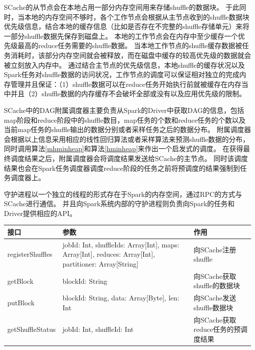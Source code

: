 SCache的从节点会在本地占用一部分内存空间用来存储shuffle的数据块。
于此同时，当本地的内存空间不够时，各个工作节点会根据从主节点收到的shuffle数据块优先级信息，结合本地的缓存信息（比如是否存在不完整的shuffle存储单元）来将一部分shuffle数据先保存到磁盘上。
本地的工作节点会在内存中至少缓存一个优先级最高的reduce任务需要的shuffle数据。
当本地工作节点的shuffle缓存数据被任务消耗时，该部分内存空间就会被释放，而在磁盘中缓存的较高优先级的数据就会被立刻放入内存中。
通过结合主节点的优先级信息，本地shuffle的缓存状况以及Spark任务对shuffle数据的访问状况，工作节点的调度可以保证相对独立的完成内存管理并且保证：（1）shuffle数据可以在reduce任务开始执行前就被缓存在内存当中并且（2）shuffle数据的内存缓存不会破坏全部或没有以及应用优先级的限制。

SCache中的DAG附属调度器主要负责从Spark的Driver中获取DAG的信息，包括map阶段和reduce阶段中的shuffle数目，map任务的个数和reduce任务的个数以及当前map任务的shuffle输出的数据分别或者采样任务之后的数据分布。
附属调度器会根据以上信息采用相应的线性回归算法或者采样算法来预测shuffle数据的分布，同时调用算法\ref{mhminheap}和算法\ref{hminheap}来作出一个启发式的调度。
在获得最终调度结果之后，附属调度器会将调度结果发送给SCache的主节点。
同时该调度结果也会在Spark任务调度器调度reduce阶段的任务之前将预调度的结果强制到任务调度器上。

守护进程以一个独立的线程的形式存在于Spark的内存空间，通过RPC的方式与SCache进行通信。
并且向Spark系统内部的守护进程则负责向Spark的任务和Driver提供相应的API。

\begin{table}[!hpb]
    \centering
    \begin{tabular}{ | m{2.5cm} | m{8cm} | m{5cm} | }
        \hline
        接口 & 参数 & 作用 \\ [0.5ex]
        \hline
        \hline
        registerShuffles & jobId: Int, shuffleIds: Array[Int], maps: Array[Int], reduces: Array[Int], partitioner: Array[String] & 向SCache注册shuffle \\ \hline
        getBlock & blockId: String & 向SCache获取shuffle的数据块 \\ \hline
        putBlock & blockId: String, data: Array[Byte], len: Int & 向SCache发送shuffle数据块 \\ \hline
        getShuffleStatus & jobId: Int, shuffleId: Int & 向SCache获取reduce任务的预调度结果 \\
        \hline
    \end{tabular}
\end{table}
